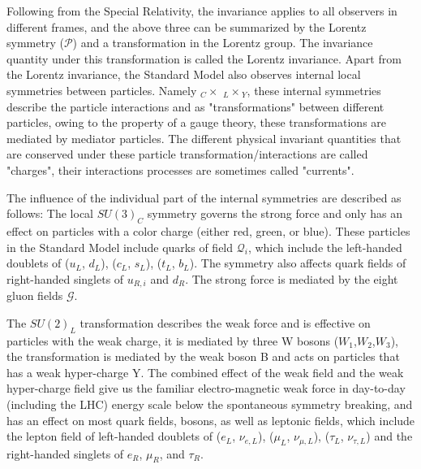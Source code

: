 


Following from the Special Relativity, the invariance applies to all observers in different frames, and the above three can be summarized by the Lorentz symmetry ($\mathcal{P}$) and a transformation in the Lorentz group. The invariance quantity under this transformation is called the Lorentz invariance. 
    Apart from the Lorentz invariance, the Standard Model also observes internal local symmetries between particles. Namely  \SUthree$_C \times $ \SUtwo$_L \times$\Uone$_{Y}$, these internal symmetries describe the particle interactions and as "transformations" between different particles, owing to the property of a gauge theory, these transformations are mediated by mediator particles. The different physical invariant quantities that are conserved under these particle
    transformation/interactions are called "charges", their interactions processes are sometimes called "currents".

    The influence of the individual part of the internal symmetries are described as follows: The local $SU(3)_{C}$ symmetry governs the strong force and only has an effect on particles with a color charge (either red, green, or blue). These particles in the Standard Model include quarks of field $\mathcal{Q}_{i}$, which include the left-handed doublets of ($u_{L}$, $d_{L}$), ($c_{L}$, $s_{L}$), ($t_{L}$, $b_{L}$). The symmetry also affects quark fields of right-handed singlets of $u_{R,i}$ and $d_{R}$. The strong force is mediated by the eight gluon fields $\mathcal{G}$.

    The $SU(2)_{L}$ transformation describes the weak force and is effective on particles with the weak charge, it is mediated by three W bosons ($W_{1}$,$W_{2}$,$W_{3}$), the \Uone transformation is mediated by the weak boson B and acts on particles that has a weak hyper-charge Y. The combined effect of the weak field and the weak hyper-charge field give us the familiar electro-magnetic weak force in day-to-day (including the LHC) energy scale below the spontaneous symmetry breaking, and has an effect on most quark fields, bosons, as well as leptonic fields, which include the lepton field of left-handed doublets of ($e_{L}$, $\nu_{e,L}$), ($\mu_{L}$, $\nu_{\mu,L}$), ($\tau_{L}$, $\nu_{\tau,L}$) and the right-handed singlets of $e_{R}$, $\mu_{R}$, and $\tau_{R}$.

